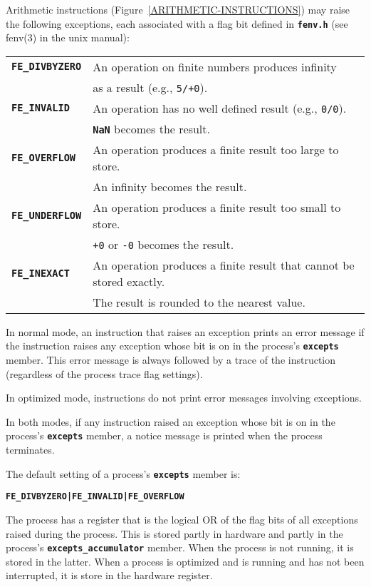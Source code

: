 \documentclass[12pt]{article}
\makeatletter
\newcommand{\TT}[1]{{\tt \bfseries #1}}
\newcommand{\ttkey}[1]{\TT{#1}\index{#1@{\tt #1}}}
\newcommand{\EOL}{\penalty \exhyphenpenalty}
\makeatother
\begin{document}
Arithmetic instructions (Figure~\ref{ARITHMETIC-INSTRUCTIONS})
may raise the following exceptions, each
associated with a flag bit defined in \TT{fenv.h}
(see fenv(3) in the unix manual):
\begin{center}
\begin{tabular}{|l|l|}
\hline
\ttkey{FE\_DIVBYZERO} &  An operation on finite numbers produces infinity \\
                      &  as a result (e.g., {\tt 5/+0}).
\\\hline
\ttkey{FE\_INVALID} & An operation has no well defined result
                      (e.g., {\tt 0/0}). \\
		    & \TT{NaN} becomes the result.
\\\hline
\ttkey{FE\_OVERFLOW} & An operation produces a finite result too large to
                       store. \\
		     & An infinity becomes the result.
\\\hline
\ttkey{FE\_UNDERFLOW} & An operation produces a finite result too small to
                        store. \\
	              & {\tt +0} or {\tt -0} becomes the result.
\\\hline
\ttkey{FE\_INEXACT} & An operation produces a finite result that cannot
                      be stored exactly. \\
		    & The result is rounded to the nearest value.
\\\hline
\end{tabular}
\end{center}

In normal mode, an instruction that raises an exception prints
an error message if the instruction raises any exception whose bit
is on in the process's \TT{excepts} member.
This error message is always followed by a trace of the instruction
(regardless of the process trace flag settings).

In optimized mode, instructions do not print error messages
involving exceptions.

In both modes, if any instruction raised an exception whose bit
is on in the process's \TT{excepts} member, a notice message is
printed when the process terminates.

The default setting of a process's \TT{excepts} member
is:
\begin{center}
\TT{FE\_DIVBYZERO|FE\_INVALID|FE\_OVERFLOW}
\end{center}

The process has a register that is the logical OR of the flag bits
of all exceptions
raised during the process.  This is stored partly in hardware
and partly in the process's \TT{excepts\_\EOL accumulator} member.
When the process is not running, it is stored in the latter.  When
a process is optimized and is running and has not been interrupted,
it is store in the hardware register.
\end{document}
